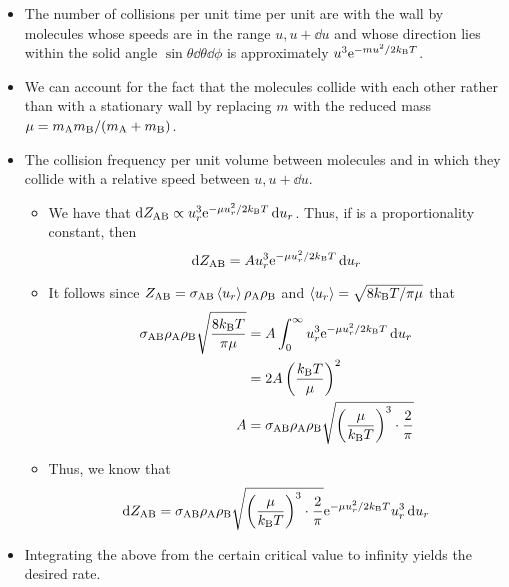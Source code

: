 \documentclass[../notes.tex]{subfiles}
\begin{document}
\begin{itemize}
\begin{itemize}
        \item The number of collisions per unit time per unit are with the wall by molecules whose speeds are in the range $u,u+\dd{u}$ and whose direction lies within the solid angle $\sin\theta\dd{\theta}\dd{\phi}$ is approximately $u^3\e[-mu^2/2\kB T]$.
        \item We can account for the fact that the molecules collide with each other rather than with a stationary wall by replacing $m$ with the reduced mass $\mu=m_{\ce{A}}m_{\ce{B}}/(m_{\ce{A}}+m_{\ce{B}})$.
        \item The collision frequency per unit volume between molecules  and  in which they collide with a relative speed between $u,u+\dd{u}$.
        \begin{itemize}
            \item We have that $\dd{Z_{\ce{A}\ce{B}}}\propto u_r^3\e[-\mu u_r^2/2\kB T]\dd{u_r}$. Thus, if  is a proportionality constant, then
            \begin{equation*}
                \dd{Z_{\ce{A}\ce{B}}} = Au_r^3\e[-\mu u_r^2/2\kB T]\dd{u_r}
            \end{equation*}
            \item It follows since $Z_{\ce{A}\ce{B}}=\sigma_{\ce{A}\ce{B}}\prb{u_r}\rho_{\ce{A}}\rho_{\ce{B}}$ and $\prb{u_r}=\sqrt{8\kB T/\pi\mu}$ that
            \begin{align*}
                \sigma_{\ce{A}\ce{B}}\rho_{\ce{A}}\rho_{\ce{B}}\sqrt{\frac{8\kB T}{\pi\mu}} &= A\int_0^\infty u_r^3\e[-\mu u_r^2/2\kB T]\dd{u_r}\\
                &= 2A\left( \frac{\kB T}{\mu} \right)^2\\
                A &= \sigma_{\ce{A}\ce{B}}\rho_{\ce{A}}\rho_{\ce{B}}\sqrt{\left( \frac{\mu}{\kB T} \right)^3\cdot\frac{2}{\pi}}
            \end{align*}
            \item Thus, we know that
            \begin{equation*}
                \dd{Z_{\ce{A}\ce{B}}} = \sigma_{\ce{A}\ce{B}}\rho_{\ce{A}}\rho_{\ce{B}}\sqrt{\left( \frac{\mu}{\kB T} \right)^3\cdot\frac{2}{\pi}}\e[-\mu u_r^2/2\kB T]u_r^3\dd{u_r}
            \end{equation*}
        \end{itemize}
        \item Integrating the above from the certain critical value to infinity yields the desired rate.
    \end{itemize}

\end{itemize}
\end{document}
